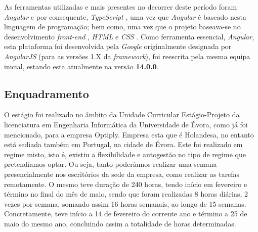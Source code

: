 \documentclass{article}
\begin{document}
\hspace*{0.5cm} As ferramentas utilizadas e mais presentes no decorrer deste período foram \emph{Angular} \cite{angular, angular-wiki, angular-docs, angular-repo} e por consequente, \emph{TypeScript} \cite{ts, ts-docs}, uma vez que \emph{Angular} é baseado nesta linguagem de programação; bem como, uma vez que o projeto baseava-se no desenvolvimento \emph{front-end} \cite{frontend}, \emph{HTML} \cite{html-article, html-wiki} e \emph{CSS} \cite{css}. \newline
\hspace*{0.5cm} Como ferramenta essencial, \emph{Angular}, esta plataforma foi desenvolvida pela \emph{Google} \cite{google} originalmente designada por \emph{AngularJS} \cite{old-angular} (para as versões 1.X da \emph{framework}), foi reescrita pela mesma equipa inicial, estando esta atualmente na versão \textbf{14.0.0}. \newline

\subsection{Enquadramento}
\hspace*{0.5cm} O estágio foi realizado no âmbito da Unidade Curricular Estágio-Projeto da licenciatura em Engenharia Informática da Universidade de Évora, como já foi mencionado, para a empresa Optiply. Empresa esta que é Holandesa, no entanto está sediada também em Portugal, na cidade de Évora. \newline 
\hspace*{0.5cm} Este foi realizado em regime misto, isto é, existiu a flexibilidade e autogestão no tipo de regime que pretendíamos optar. Ou seja, tanto poderíamos realizar uma semana presencialmente nos escritórios da sede da empresa, como realizar as tarefas remotamente. \newline
\hspace*{0.5cm} O mesmo teve duração de 240 horas, tendo início em fevereiro e término no final do mês de maio, sendo que foram realizadas 8 horas diárias, 2 vezes por semana, somando assim 16 horas semanais, ao longo de 15 semanas. Concretamente, teve início a 14 de fevereiro do corrente ano e término a 25 de maio do mesmo ano, concluindo assim a totalidade de horas determinadas. \newline
\end{document}
